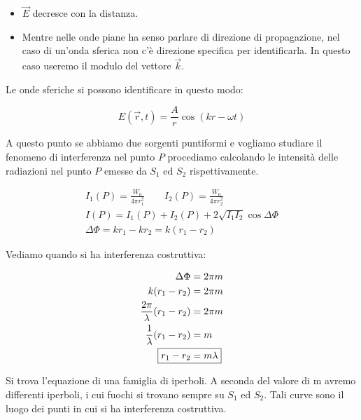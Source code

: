 \begin{itemize}
	\item $\vec{E}$ decresce con la distanza.
	\item Mentre nelle onde piane ha senso parlare di direzione di propagazione, nel caso di un'onda sferica non c'è direzione specifica per identificarla. In questo caso useremo il modulo del vettore $\vec{k} $.
\end{itemize}

Le onde sferiche si possono identificare in questo modo:

\[
	E(\vec{r},t) = \frac{A}{r} \cos (kr-\omega t)
\]

A questo punto se abbiamo due sorgenti puntiformi e vogliamo studiare il fenomeno di interferenza nel punto $P$ procediamo calcolando le intensità delle radiazioni nel punto $P$ emesse da $S_1$ ed $S_2$ rispettivamente.

\begin{gather*}
	I_1(P) = \frac{W_0}{4\pi r_1^2} \qquad I_2(P) = \frac{W_0}{4\pi r_2^2} \\
	I(P) = I_1(P) + I_2(P) + 2\sqrt{I_1I_2} \cos \Delta \Phi \\
	\Delta \Phi = kr_1-kr_2 = k(r_1-r_2  )
\end{gather*}

Vediamo quando si ha interferenza costruttiva:

\begin{align*}
	\Delta \Phi &= 2\pi m \\
	k(r_1-r_2) &= 2\pi m \\
	\frac{2\pi}{\lambda}(r_1-r_2) &= 2\pi m \\
	\frac{1}{\lambda}(r_1-r_2) &= m \\
	\Aboxed{r_1-r_2 &= m\lambda}
\end{align*}

Si trova l'equazione di una famiglia di iperboli. A seconda del valore di m avremo differenti iperboli, i cui fuochi si trovano sempre su $S_1$ ed $S_2$. Tali curve sono il luogo dei punti in cui si ha interferenza costruttiva.

